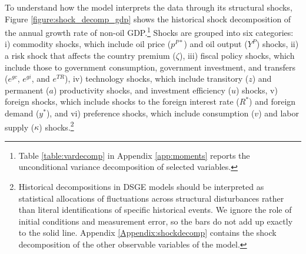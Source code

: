 \documentclass[12pt]{article}
\begin{document}
To understand how the model interprets the data through its structural shocks, Figure \ref{figure:shock_decomp_gdp} shows the historical shock decomposition of the annual growth rate of non-oil GDP.\footnote{Table \ref{table:vardecomp} in Appendix \ref{app:moments} reports the unconditional variance decomposition of selected variables.} Shocks are grouped into six categories: i) commodity shocks, which include oil price ($p^{P*}$) and oil output ($Y^{P}$) shocks, ii) a risk shock that affects the country premium ($\zeta$), iii) fiscal policy shocks, which include those to government consumption, government investment, and transfers ($e^{gc}$, $e^{gi}$, and $e^{TR}$), iv) technology shocks, which include transitory ($z$) and permanent ($a$) productivity shocks, and investment efficiency ($u$) shocks, v) foreign shocks, which include shocks to the foreign interest rate ($R^*$) and foreign demand ($y^*$), and vi) preference shocks, which include consumption ($v$) and labor supply ($\kappa$) shocks.\footnote{Historical decompositions in DSGE models should be interpreted as statistical allocations of fluctuations across structural disturbances rather than literal identifications of specific historical events. We ignore the role of initial conditions and measurement error, so the bars do not add up exactly to the solid line. Appendix \ref{Appendix:shockdecomp} contains the shock decomposition of the other observable variables of the model.} 
\end{document}
